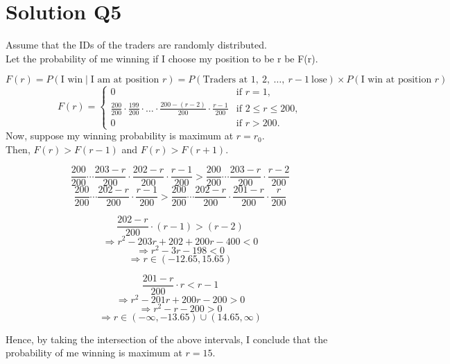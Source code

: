 \documentclass[fleqn]{article}
\begin{document}
\section{Solution Q5}

Assume that the IDs of the traders are randomly distributed.\\
Let the probability of me winning if I choose my position to be r be F(r).

\[
F(r) = P\left(\text{I win} \mid \text{I am at position } r\right) = P\left(\text{Traders at } 1,\ 2,\ \ldots,\ r-1\ \text{lose}\right) \times P\left(\text{I win at position } r\right)
\]
\[
F(r) =
\begin{cases} 
0 & \text{if } r = 1, \\
\frac{200}{200} \cdot \frac{199}{200} \cdot \ldots \cdot \frac{200-(r-2)}{200} \cdot \frac{r - 1}{200} & \text{if } 2 \leq r \leq 200, \\
0 & \text{if } r > 200.
\end{cases}
\]
Now, suppose my winning probability is maximum at $r=r_0$.\\
Then, $F(r) > F(r-1)$ and $F(r)>F(r+1)$.

\[
\frac{200}{200} \cdots \frac{203-r}{200} \cdot \frac{202-r}{200} \cdot \frac{r - 1}{200} > \frac{200}{200} \cdots \frac{203-r}{200} \cdot \frac{r - 2}{200}
\]
\[
\frac{200}{200} \cdots \frac{202-r}{200} \cdot \frac{r - 1}{200} > \frac{200}{200} \cdots \frac{202-r}{200} \cdot \frac{201-r}{200} \cdot \frac{r}{200}
\]

\vspace{0.5 cm}

\begin{minipage}{0.45\textwidth}
\raggedright
\[
\frac{202-r}{200} \cdot (r-1) > (r-2)
\]
\[
\Rightarrow r^2 - 203r + 202 + 200r - 400 < 0
\]
\[
\Rightarrow r^2 - 3r - 198 < 0
\]
\[
\Rightarrow r \in (-12.65, 15.65)
\]
\end{minipage}
\hfill
\begin{minipage}{0.45\textwidth}
\raggedright
\[
\frac{201-r}{200} \cdot r < r-1
\]
\[
\Rightarrow r^2 - 201r + 200r - 200 > 0
\]
\[
\Rightarrow r^2 - r - 200 > 0
\]
\[
\Rightarrow r \in (-\infty, -13.65) \cup (14.65, \infty)
\]
\end{minipage}

\vspace{0.5 cm}
Hence, by taking the intersection of the above intervals, I conclude that the probability of me winning is maximum at $r=15$.
\end{document}
